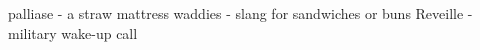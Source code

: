 palliase - a straw mattress
waddies - slang for sandwiches or buns
Reveille - military wake-up call
